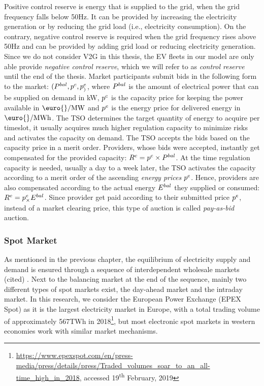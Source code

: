 \documentclass[a4paper, 12pt]{article}
\let\cite\shortcite
\begin{document}
Positive control reserve is energy that is supplied to the grid, when the grid
frequency falls below 50Hz. It can be provided by increasing the electricity
generation or by reducing the grid load (i.e., electricity consumption). On the
contrary, negative control reserve is required when the grid frequency rises
above 50Hz and can be provided by adding grid load or reducing electricity
generation. Since we do not consider V2G in this thesis, the EV fleets in our
model are only able provide \emph{negative control reserve}, which we will refer to
as \emph{control reserve} until the end of the thesis. Market participants submit
bids in the following form to the market: \((P^{bal}_{}, p^c_{}, p^e_{)}\), where \(P^{bal}_{}\)
is the amount of electrical power that can be supplied on demand in kW, \(p^c_{}\) is
the capacity price for keeping the power available in \(\text{\euro{}/MW}\) and
\(p^e_{}\) is the energy price for delivered energy in \(\text{\euro{}/MWh}\). The TSO
determines the target quantity of energy to acquire per timeslot, it usually
acquires much higher regulation capacity to minimize risks and activates the
capacity on demand. The TSO accepts the bids based on the capacity price in a
merit order. Providers, whose bids were accepted, instantly get compensated for
the provided capacity: \(R^c = p^c_{} \times P^{bal}_{}\). At the time regulation
capacity is needed, usually a day to a week later, the TSO activates the
capacity according to a merit order of the ascending \emph{energy prices} \(p^e_{}\).
Hence, providers are also compensated according to the actual energy \(E^{bal}_{}\)
they supplied or consumed: \(R^e = p^e_{\times} E^{bal}_{}\). Since provider get paid
according to their submitted price \(p^e_{}\), instead of a market clearing price,
this type of auction is called \emph{pay-as-bid} auction.
\subsubsection{Spot Market \label{sec-spot-market}}
\label{sec:orgc7bc1bc}
As mentioned in the previous chapter, the equilibrium of electricity supply and
demand is ensured through a sequence of interdependent wholesale markets (cited)
\cite{pape16_are_fundam_enoug}. Next to the balancing market at the end of the
sequence, mainly two different types of spot markets exist, the day-ahead
market and the intraday market. In this research, we consider the European Power
Exchange (EPEX Spot) as it is the largest electricity market in Europe, with a
total trading volume of approximately 567TWh in 2018\footnote{\url{https://www.epexspot.com/en/press-media/press/details/press/Traded\_volumes\_soar\_to\_an\_all-time\_high\_in\_2018},
accessed 19\textsuperscript{th} February, 2019\label{orgedd4d8a}}, but most electronic
spot markets in western economies work with similar market mechanisms.
\end{document}
